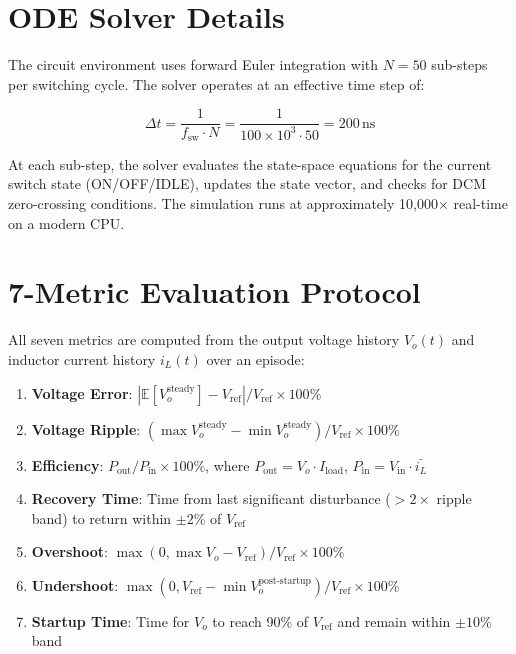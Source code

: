 \documentclass[11pt]{article}
\begin{document}
\section{ODE Solver Details}

The circuit environment uses forward Euler integration with $N=50$ sub-steps
per switching cycle. The solver operates at an effective time step of:

\begin{equation}
\Delta t = \frac{1}{f_{\text{sw}} \cdot N} = \frac{1}{100 \times 10^3 \cdot 50}
= 200\,\text{ns}
\end{equation}

At each sub-step, the solver evaluates the state-space equations for the
current switch state (ON/OFF/IDLE), updates the state vector, and checks
for DCM zero-crossing conditions. The simulation runs at approximately
10,000$\times$ real-time on a modern CPU.

\section{7-Metric Evaluation Protocol}

All seven metrics are computed from the output voltage history $V_o(t)$ and
inductor current history $i_L(t)$ over an episode:

\begin{enumerate}[leftmargin=*]
    \item \textbf{Voltage Error}: $| \mathbb{E}[V_o^{\text{steady}}] - V_{\text{ref}} | / V_{\text{ref}} \times 100\%$
    \item \textbf{Voltage Ripple}: $(\max V_o^{\text{steady}} - \min V_o^{\text{steady}}) / V_{\text{ref}} \times 100\%$
    \item \textbf{Efficiency}: $P_{\text{out}} / P_{\text{in}} \times 100\%$, where $P_{\text{out}} = V_o \cdot I_{\text{load}}$, $P_{\text{in}} = V_{\text{in}} \cdot \bar{i_L}$
    \item \textbf{Recovery Time}: Time from last significant disturbance ($>2\times$ ripple band) to return within $\pm2\%$ of $V_{\text{ref}}$
    \item \textbf{Overshoot}: $\max(0, \max V_o - V_{\text{ref}}) / V_{\text{ref}} \times 100\%$
    \item \textbf{Undershoot}: $\max(0, V_{\text{ref}} - \min V_o^{\text{post-startup}}) / V_{\text{ref}} \times 100\%$
    \item \textbf{Startup Time}: Time for $V_o$ to reach 90\% of $V_{\text{ref}}$ and remain within $\pm10\%$ band
\end{enumerate}
\end{document}
